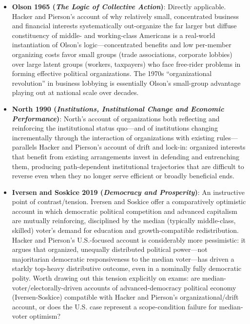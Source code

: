\documentclass[12pt]{article}
\begin{document}
\begin{itemize}[leftmargin=*, itemsep=4pt]
    \item \textbf{Olson 1965 (\textit{The Logic of Collective Action})}: Directly applicable. Hacker and Pierson's account of why relatively small, concentrated business and financial interests systematically out-organize the far larger but diffuse constituency of middle- and working-class Americans is a real-world instantiation of Olson's logic---concentrated benefits and low per-member organizing costs favor small groups (trade associations, corporate lobbies) over large latent groups (workers, taxpayers) who face free-rider problems in forming effective political organizations. The 1970s ``organizational revolution'' in business lobbying is essentially Olson's small-group advantage playing out at national scale over decades.
    \item \textbf{North 1990 (\textit{Institutions, Institutional Change and Economic Performance})}: North's account of organizations both reflecting and reinforcing the institutional status quo---and of institutions changing incrementally through the interaction of organizations with existing rules---parallels Hacker and Pierson's account of drift and lock-in: organized interests that benefit from existing arrangements invest in defending and entrenching them, producing path-dependent institutional trajectories that are difficult to reverse even when they no longer serve efficient or broadly beneficial ends.
    \item \textbf{Iversen and Soskice 2019 (\textit{Democracy and Prosperity})}: An instructive point of contrast/tension. Iversen and Soskice offer a comparatively optimistic account in which democratic political competition and advanced capitalism are mutually reinforcing, disciplined by the median (typically middle-class, skilled) voter's demand for education and growth-compatible redistribution. Hacker and Pierson's U.S.-focused account is considerably more pessimistic: it argues that organized, unequally distributed political power---not majoritarian democratic responsiveness to the median voter---has driven a starkly top-heavy distributive outcome, even in a nominally fully democratic polity. Worth drawing out this tension explicitly on exams: are median-voter/electorally-driven accounts of advanced-democracy political economy (Iversen-Soskice) compatible with Hacker and Pierson's organizational/drift account, or does the U.S. case represent a scope-condition failure for median-voter optimism?

\end{itemize}
\end{document}
